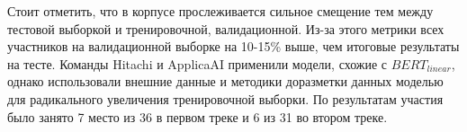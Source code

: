 Стоит отметить, что в корпусе прослеживается сильное смещение тем между тестовой выборкой и тренировочной, валидационной. Из-за этого метрики всех участников на валидационной выборке на 10-15\% выше, чем итоговые результаты на тесте. Команды Hitachi и ApplicaAI применили модели, схожие с $BERT_{linear}$, однако использовали внешние данные и методики доразметки данных моделью для радикального увеличения тренировочной выборки. По результатам\cite{dimov-etal-2020-nopropaganda} участия было занято 7 место из 36 в первом треке и 6 из 31 во втором треке.

